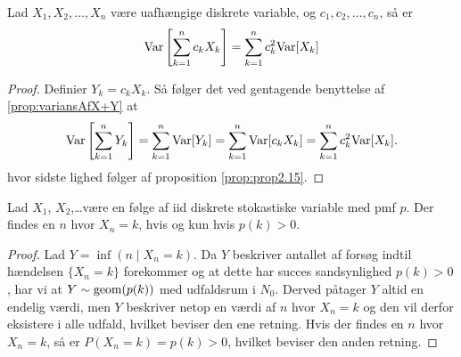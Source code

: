 \begin{cor} \label{cor:variansAfLinearKombinationAfUafhængigeVariable}
  Lad $X_{1}, X_{2}, \ldots, X_{n}$ være uafhængige diskrete variable, og $c_{1}, c_{2}, \ldots, c_{n}$, så er
  \begin{equation*}
    \textnormal{Var}\left[\sum^{n}_{k = 1} c_{k}X_{k}\right] = \sum_{k=1}^n c_{k}^{2} \textnormal{Var}[X_{k}]
  \end{equation*}
\end{cor}
\begin{proof}
  Definier $Y_{k} = c_{k}X_{k}$. Så følger det ved gentagende benyttelse af
  \ref{prop:variansAfX+Y} at
  \begin{equation*}
    \textnormal{Var}\left[\sum_{k=1}^n Y_{k}\right] = \sum_{k=1}^n \textnormal{Var}[Y_{k}] = \sum_{k=1}^n \textnormal{Var}[c_{k}X_{k}] = \sum_{k=1}^n c_{k}^{2}\textnormal{Var}[X_{k}].
  \end{equation*}
  hvor sidste lighed følger af proposition \ref{prop:prop2.15}.
\end{proof}

\begin{prop}
    Lad $X_1$, $X_2$,\dots være en følge af iid diskrete stokastiske variable med pmf $p$.
    Der findes en $n$ hvor $X_n=k$, hvis og kun hvis $p(k)>0$.
\end{prop}

\begin{proof}
    Lad $Y=\inf(n\mid X_n=k)$.
    Da $Y$ beskriver antallet af forsøg indtil hændelsen $\{X_n=k\}$ forekommer og at dette har succes sandsynlighed $p(k)>0$, har vi at $Y\sim \textnormal{geom}(p(k))$ med udfaldsrum i $N_0$.
    Derved påtager $Y$ altid en endelig værdi, men $Y$ beskriver netop en værdi af $n$ hvor $X_n=k$ og den vil derfor eksistere i alle udfald, hvilket beviser den ene retning. Hvis der findes en $n$ hvor $X_n=k$, så er $P(X_n=k)=p(k)>0$, hvilket beviser den anden retning.
\end{proof}
